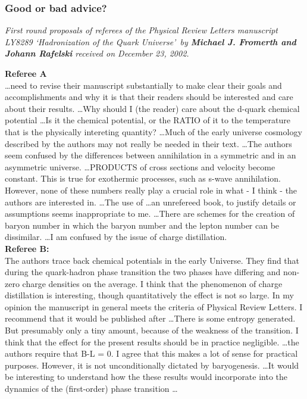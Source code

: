 \subsubsection{Good or bad advice?}
\noindent\textit{First round proposals of referees of the  Physical Review Letters manuscript LY8289 \lq Hadronization of the Quark Universe\rq\  by \textbf{Michael J. Fromerth and Johann Rafelski} received  on December 23,  2002.}\\[-0.7cm]
%
\begin{mdframed}[linecolor=gray,roundcorner=12pt,backgroundcolor=GreenYellow!15,linewidth=1pt,leftmargin=0cm,rightmargin=0cm,topline=true,bottomline=true,skipabove=12pt]\relax%
% 
\textbf{Referee A}\\
\indent \ldots need to revise their manuscript substantially to make clear their goals and accomplishments and why it is that their readers should be interested and care about their results. \ldots  Why should I (the reader) care about the d-quark chemical potential \ldots Is it the chemical potential, or the RATIO of it to the temperature that is the physically intereting quantity? \ldots  Much of the early universe cosmology described by the authors may not really be needed in their text. \ldots The authors seem confused by the differences between annihilation in a symmetric and in an asymmetric universe. \ldots PRODUCTS of cross sections and velocity become constant. This is true for exothermic processes, such as s-wave annihilation. However, none of these numbers really play a crucial role in what - I think - the authors are interested in. \ldots The use of \ldots  an unrefereed book, to justify details or assumptions seems inappropriate to me. \ldots There are schemes for the creation of baryon number in which the baryon number and the lepton number can be dissimilar. \ldots  I am confused by the issue of charge distillation.\\

\noindent\textbf{Referee B:}\\
\indent The authors trace back chemical potentials in the early Universe. They find that during the quark-hadron phase transition the two phases have differing and non-zero charge densities on the average. I think that the phenomenon of charge distillation is interesting, though quantitatively the effect is not so large. In my opinion the manuscript in general meets the criteria of Physical Review Letters. I recommend that it would be published after \ldots  There is some entropy generated. But presumably only a tiny amount, because of the weakness of the transition. I think that the effect for the present results should be in practice negligible. \ldots  the authors require that B-L = 0. I agree that this makes a lot of sense for practical purposes. However, it is not unconditionally dictated by baryogenesis. \ldots It would be interesting to understand how the these results would incorporate into the dynamics of the (first-order) phase transition \ldots
\end{mdframed}
\vskip 0.5cm 


